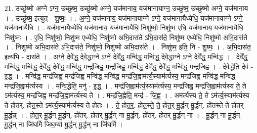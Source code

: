 \documentclass[17pt]{extarticle}
\begin{document}
21. उच्छु॑ष्मो अग्ने ऽग्न॒ उच्छु॑ष्म॒ उच्छु॑ष्मो अग्ने॒ यज॑मानाय॒ यज॑मानायाग्न॒ उच्छु॑ष्म॒ उच्छु॑ष्मो अग्ने॒ यज॑मानाय । . उच्छु॑ष्म॒ इत्युत् - शु॒ष्मः॒ । . अ॒ग्ने॒ यज॑मानाय॒ यज॑मानायाग्ने ऽग्ने॒ यज॑मानायैध्येधि॒ यज॑मानायाग्ने ऽग्ने॒ यज॑मानायैधि । . यज॑मानायैध्येधि॒ यज॑मानाय॒ यज॑मानायैधि॒ निशु॑ष्मो॒ निशु॑ष्म एधि॒ यज॑मानाय॒ यज॑मानायैधि॒ निशु॑ष्मः । . ए॒धि॒ निशु॑ष्मो॒ निशु॑ष्म एध्येधि॒ निशु॑ष्मो अभि॒दास॑ते ऽभि॒दास॑ते॒ निशु॑ष्म एध्येधि॒ निशु॑ष्मो अभि॒दास॑ते । . निशु॑ष्मो अभि॒दास॑ते ऽभि॒दास॑ते॒ निशु॑ष्मो॒ निशु॑ष्मो अभि॒दास॑ते । . निशु॑ष्म॒ इति॒ नि - शु॒ष्मः॒ । . अ॒भि॒दास॑त॒ इत्य॑भि - दास॑ते । . अग्ने॒ देवे᳚द्ध॒ देवे॒द्धाग्ने ऽग्ने॒ देवे᳚द्ध॒ मन्वि॑द्ध॒ मन्वि॑द्ध॒ देवे॒द्धाग्ने ऽग्ने॒ देवे᳚द्ध॒ मन्वि॑द्ध । . देवे᳚द्ध॒ मन्वि॑द्ध॒ मन्वि॑द्ध॒ देवे᳚द्ध॒ देवे᳚द्ध॒ मन्वि॑द्ध॒ मन्द्र॑जिह्व॒ मन्द्र॑जिह्व॒ मन्वि॑द्ध॒ देवे᳚द्ध॒ देवे᳚द्ध॒ मन्वि॑द्ध॒ मन्द्र॑जिह्व । . देवे॒द्धेति॒ देव॑ - इ॒द्ध॒ । . मन्वि॑द्ध॒ मन्द्र॑जिह्व॒ मन्द्र॑जिह्व॒ मन्वि॑द्ध॒ मन्वि॑द्ध॒ मन्द्र॑जि॒ह्वाम॑र्त्य॒स्याम॑र्त्यस्य॒ मन्द्र॑जिह्व॒ मन्वि॑द्ध॒ मन्वि॑द्ध॒ मन्द्र॑जि॒ह्वाम॑र्त्यस्य । . मन्वि॒द्धेति॒ मनु॑ - इ॒द्ध॒ । . मन्द्र॑जि॒ह्वाम॑र्त्य॒स्याम॑र्त्यस्य॒ मन्द्र॑जिह्व॒ मन्द्र॑जि॒ह्वाम॑र्त्यस्य ते॒ ते ऽम॑र्त्यस्य॒ मन्द्र॑जिह्व॒ मन्द्र॑जि॒ह्वाम॑र्त्यस्य ते । . मन्द्र॑जि॒ह्वेति॒ मन्द्र॑ - जि॒ह्व॒ । . अम॑र्त्यस्य ते॒ ते ऽम॑र्त्य॒स्याम॑र्त्यस्य ते होतर्. होत॒स्ते ऽम॑र्त्य॒स्याम॑र्त्यस्य ते होतः । . ते॒ हो॒त॒र्॒. हो॒त॒स्ते॒ ते॒ हो॒त॒र् मू॒र्द्धन् मू॒र्द्धन्. हो॑तस्ते ते होतर् मू॒र्द्धन्न् । . हो॒त॒र् मू॒र्द्धन् मू॒र्द्धन्. हो॑तर्. होतर् मू॒र्द्धन् ना मू॒र्द्धन्. हो॑तर्. होतर् मू॒र्द्धन् ना । . मू॒र्द्धन् ना मू॒र्द्धन् मू॒र्द्धन् ना जि॑घर्मि जिघ॒र्म्या मू॒र्द्धन् मू॒र्द्धन् ना जि॑घर्मि । \newline
\end{document}
